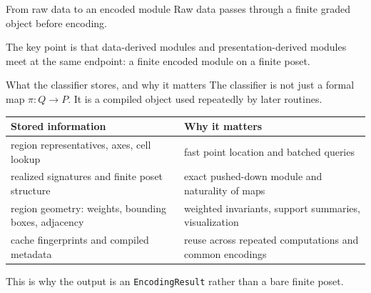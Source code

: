 \documentclass[aspectratio=169,11pt]{beamer}
\begin{document}
\begin{frame}{From raw data to an encoded module}
\small
Raw data passes through a finite graded object before encoding.

\medskip
\centering
{}

\medskip
\raggedright
The key point is that data-derived modules and presentation-derived modules meet at the same endpoint: a finite encoded module on a finite poset.
\end{frame}

\begin{frame}{What the classifier stores, and why it matters}
\small
The classifier is not just a formal map $\pi:Q\to P$.  It is a compiled object used repeatedly by later routines.

\medskip
\begin{tabularx}{\textwidth}{>{\raggedright\arraybackslash}p{3.7cm}X}
\toprule
Stored information & Why it matters \\
\midrule
region representatives, axes, cell lookup & fast point location and batched queries \\
realized signatures and finite poset structure & exact pushed-down module and naturality of maps \\
region geometry: weights, bounding boxes, adjacency & weighted invariants, support summaries, visualization \\
cache fingerprints and compiled metadata & reuse across repeated computations and common encodings \\
\bottomrule
\end{tabularx}

\medskip
This is why the output is an \texttt{EncodingResult} rather than a bare finite poset.
\end{frame}
\end{document}
